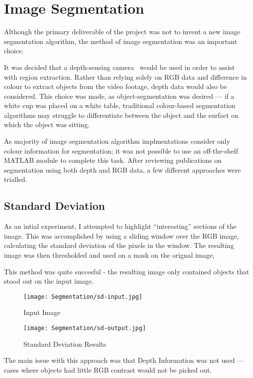 \section{Image Segmentation}
Although the primary deliverable of the project was not to invent a new image segmentation algorithm, the method of image segmentation was an important choice.

It was decided that a depth-sensing camera~\cite{xtion} would be used in order to assist with region extraction. Rather than relying solely on RGB data and difference in colour to extract objects from the video footage, depth data would also be considered. This choice was made, as object-segmentation was desired --- if a white cup was placed on a white table, traditional colour-based segmentation algorithms may struggle to differentiate between the object and the surfact on which the object was sitting.

As majority of image segmentation algorithm implmentations consider only colour information for segmentation; it was not possible to use an off-the-shelf MATLAB module to complete this task. After reviewing publications on segmentation using both depth and RGB data, a few different approaches were trialled.

\subsection{Standard Deviation}
As an intial experiment, I attempted to highlight ``interesting'' sections of the image. This was accomplished by using a sliding window over the RGB image, calculating the standard deviation of the pixels in the window. The resulting image was then thresholded and used on a mask on the orignal image,

This method was quite succesful - the resulting image only contained objects that stood out on the input image.

\begin{figure}[H]
    \centering
    \texttt{[image: Segmentation/sd-input.jpg]}
    \caption{Input Image}
\end{figure}

\begin{figure}[H]
   \centering
   \texttt{[image: Segmentation/sd-output.jpg]}
   \caption{Standard Deviation Results}

\end{figure}

The main issue with this approach was that Depth Information was not used --- cases where objects had little RGB contrast would not be picked out. 

